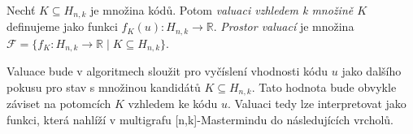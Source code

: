 










\begin{definice}[Valuace]
    Nechť $K \subseteq H_{n,k}$ je množina kódů. Potom \emph{valuaci vzhledem k množině $K$} definujeme jako funkci $f_K(u) \colon H_{n,k} \to \mathbb{R}$. \emph{Prostor valuací} je množina $\mathcal{F} = \{f_K\colon H_{n,k} \to \mathbb{R} \mid K \subseteq H_{n,k}\}$.
\end{definice}


Valuace bude v algoritmech sloužit pro vyčíslení vhodnosti kódu $u$ jako dalšího pokusu pro stav s množinou kandidátů $K\subseteq H_{n,k}$. Tato hodnota bude obvykle záviset na potomcích $K$ vzhledem ke kódu $u$. Valuaci tedy lze interpretovat jako funkci, která nahlíží v multigrafu [n,k]-Mastermindu do následujících vrcholů.

